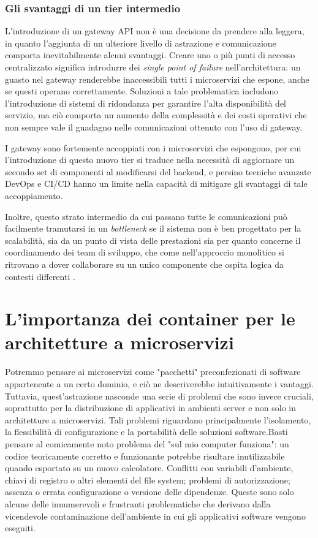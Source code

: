 \subsubsection{Gli svantaggi di un tier intermedio}
L'introduzione di un gateway API non è una decisione da prendere alla leggera, in quanto l'aggiunta di un ulteriore livello di astrazione e comunicazione comporta inevitabilmente alcuni svantaggi.
Creare uno o più punti di accesso centralizzato significa introdurre dei \emph{single point of failure} nell'architettura: un guasto nel gateway renderebbe inaccessibili tutti i microservizi che espone, anche se questi operano correttamente. Soluzioni a tale problematica includono l'introduzione di sistemi di ridondanza per garantire l'alta disponibilità del servizio, ma ciò comporta un aumento della complessità e dei costi operativi che non sempre vale il guadagno nelle comunicazioni ottenuto con l'uso di gateway.

I gateway sono fortemente accoppiati con i microservizi che espongono, per cui l'introduzione di questo nuovo tier si traduce nella necessità di aggiornare un secondo set di componenti al modificarsi del backend, e persino tecniche avanzate DevOps e CI/CD hanno un limite nella capacità di mitigare gli svantaggi di tale accoppiamento.

Inoltre, questo strato intermedio da cui passano tutte le comunicazioni può facilmente tramutarsi in un \emph{bottleneck} se il sistema non è ben progettato per la scalabilità, sia da un punto di vista delle prestazioni sia per quanto concerne il coordinamento dei team di sviluppo, che come nell'approccio monolitico si ritrovano a dover collaborare su un unico componente che ospita logica da contesti differenti \cite[47-48]{.NET_Microservices}.


\section{L'importanza dei container per le architetture a microservizi}
Potremmo pensare ai microservizi come "pacchetti" preconfezionati di software appartenente a un certo dominio, e ciò ne descriverebbe intuitivamente i vantaggi. Tuttavia, quest'astrazione nasconde una serie di problemi che sono invece cruciali, soprattutto per la distribuzione di applicativi in ambienti server e non solo in architetture a microservizi.
Tali problemi riguardano principalmente l'isolamento, la flessibilità di configurazione e la portabilità delle soluzioni software.Basti pensare al comicamente noto problema del "sul mio computer funziona": un codice teoricamente corretto e funzionante potrebbe risultare inutilizzabile quando esportato su un nuovo calcolatore.
Conflitti con variabili d'ambiente, chiavi di registro o altri elementi del file system; problemi di autorizzazione; assenza o errata configurazione o versione delle dipendenze. Queste sono solo alcune delle innumerevoli e frustranti problematiche che derivano dalla vicendevole contaminazione dell'ambiente in cui gli applicativi software vengono eseguiti.

